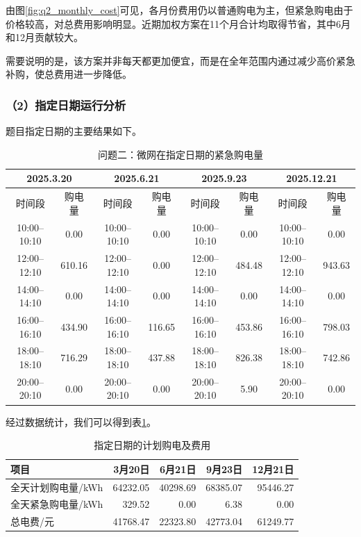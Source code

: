 由图\ref{fig:q2_monthly_cost}可见，各月份费用仍以普通购电为主，但紧急购电由于价格较高，对总费用影响明显。近期加权方案在11个月合计均取得节省，其中6月和12月贡献较大。

需要说明的是，该方案并非每天都更加便宜，而是在全年范围内通过减少高价紧急补购，使总费用进一步降低。


\subsubsection*{（2）指定日期运行分析}

题目指定日期的主要结果如下。

\begin{table}[H]
\centering
\caption{问题二：微网在指定日期的紧急购电量}
\begin{tabular}{|c|c|c|c|c|c|c|c|}
\hline
\multicolumn{2}{|c|}{2025.3.20} & \multicolumn{2}{c|}{2025.6.21} & \multicolumn{2}{c|}{2025.9.23} & \multicolumn{2}{c|}{2025.12.21} \\
\hline
时间段 & 购电量 & 时间段 & 购电量 & 时间段 & 购电量 & 时间段 & 购电量 \\
\hline
10:00--10:10 & 0.00 & 10:00--10:10 & 0.00 & 10:00--10:10 & 0.00 & 10:00--10:10 & 0.00 \\
\hline
12:00--12:10 & 610.16 & 12:00--12:10 & 0.00 & 12:00--12:10 & 484.48 & 12:00--12:10 & 943.63 \\
\hline
14:00--14:10 & 0.00 & 14:00--14:10 & 0.00 & 14:00--14:10 & 0.00 & 14:00--14:10 & 0.00 \\
\hline
16:00--16:10 & 434.90 & 16:00--16:10 & 116.65 & 16:00--16:10 & 453.86 & 16:00--16:10 & 798.03 \\
\hline
18:00--18:10 & 716.29 & 18:00--18:10 & 437.88 & 18:00--18:10 & 826.38 & 18:00--18:10 & 742.86 \\
\hline
20:00--20:10 & 0.00 & 20:00--20:10 & 0.00 & 20:00--20:10 & 5.90 & 20:00--20:10 & 0.00 \\
\hline
\end{tabular}
\end{table}

经过数据统计，我们可以得到表\ref{tab:q2_emergency_purchase}。

\begin{table}[H]
\centering
\caption{指定日期的计划购电及费用}
\label{tab:q2_emergency_purchase}
\begin{tabular}{lrrrr}
\hline
项目 & 3月20日 & 6月21日 & 9月23日 & 12月21日 \\
\hline
全天计划购电量/kWh & 64232.05 & 40298.69 & 68385.07 & 95446.27 \\
全天紧急购电量/kWh & 329.52 & 0.00 & 6.38 & 0.00 \\
总电费/元 & 41768.47 & 22323.80 & 42773.04 & 61249.77 \\
\hline
\end{tabular}
\end{table}

